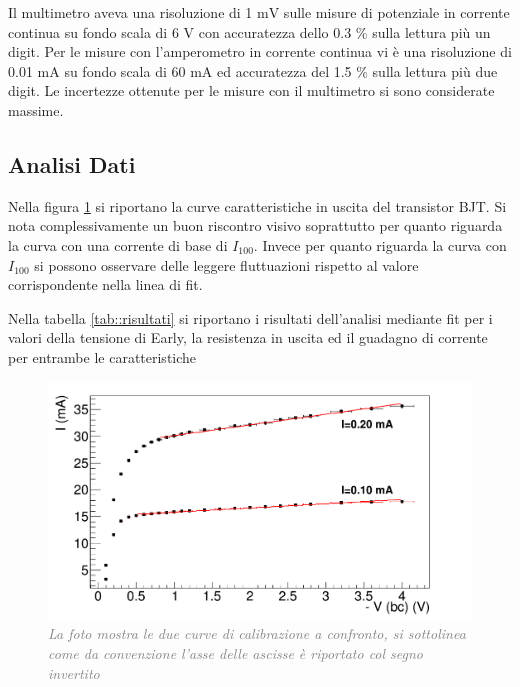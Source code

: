 \documentclass[a4paper,11pt]{article}
\begin{document}
Il multimetro aveva una risoluzione di 1 $\mathrm{mV}$ sulle misure di potenziale in corrente continua su fondo scala di 6 $\mathrm{V}$ con accuratezza dello 0.3 $\%$ sulla lettura più un digit. Per le misure con l'amperometro in corrente continua vi è una risoluzione di 0.01 $\mathrm{mA}$ su fondo scala di 60 $\mathrm{mA}$ ed accuratezza del 1.5 $\%$ sulla lettura più due digit. Le incertezze ottenute per le misure con il multimetro si sono considerate massime.

\subsection{Analisi Dati} 

Nella figura \ref{graph::curve} si riportano la curve caratteristiche in uscita del transistor BJT. Si nota complessivamente un buon riscontro visivo soprattutto per quanto riguarda la curva con una corrente di base di $I_100$. Invece per quanto riguarda la curva con $I_100$ si possono osservare delle leggere fluttuazioni rispetto al valore corrispondente nella linea di fit.

Nella tabella \ref{tab::risultati} si riportano i risultati dell'analisi mediante fit per i valori della tensione di Early, la resistenza in uscita ed il guadagno di corrente per entrambe le caratteristiche

\begin{figure}[ht]
\centering
    \includegraphics[width=0.7\linewidth]{pictures/g_tot_mean.png}
    \caption{\textit{\textcolor{gray}{La foto mostra le due curve di calibrazione a confronto, si sottolinea come da convenzione l'asse delle ascisse è riportato col segno invertito}}}
    \label{graph::curve} 
\end{figure}
\end{document}

